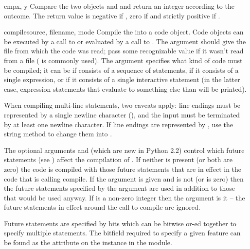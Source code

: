 \begin{funcdesc}{cmp}{x, y}
  Compare the two objects  and  and return an integer
  according to the outcome.  The return value is negative if , zero if  and strictly positive if
  .
\end{funcdesc}

\begin{funcdesc}{compile}{source, filename, mode}
  Compile the  into a code object.  Code objects can be
  executed by a call to  or evaluated by a call to
  .  The  argument should
  give the file from which the code was read; pass some recognizable value
  if it wasn't read from a file ( is commonly used).
  The  argument specifies what kind of code must be
  compiled; it can be  if  consists of a
  sequence of statements,  if it consists of a single
  expression, or  if it consists of a single
  interactive statement (in the latter case, expression statements
  that evaluate to something else than  will be printed).

  When compiling multi-line statements, two caveats apply: line
  endings must be represented by a single newline character
  (), and the input must be terminated by at least one
  newline character.  If line endings are represented by
  , use the string  method to
  change them into .

  The optional arguments  and 
  (which are new in Python 2.2) control which future statements (see
  ) affect the compilation of .  If neither is
  present (or both are zero) the code is compiled with those future
  statements that are in effect in the code that is calling compile.
  If the  argument is given and  is not
  (or is zero) then the future statements specified by the 
  argument are used in addition to those that would be used anyway.
  If  is a non-zero integer then the 
  argument is it -- the future statements in effect around the call to
  compile are ignored.

  Future statements are specified by bits which can be bitwise or-ed
  together to specify multiple statements.  The bitfield required to
  specify a given feature can be found as the 
  attribute on the  instance in the
   module.
\end{funcdesc}

